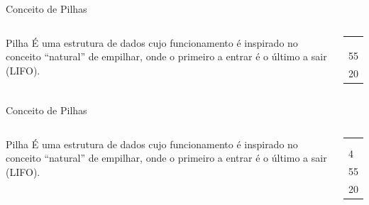 \documentclass[12pt,table,xcolor={dvipsnames}]{beamer}
\begin{document}
\begin{frame}{Conceito de Pilhas}
\begin{columns}
\begin{block}{Pilha}
É uma estrutura de dados cujo funcionamento é inspirado no conceito “natural” de empilhar, onde o primeiro a entrar é o último a sair (LIFO).
\end{block}
\begin{center}
{
\begin{tabular}{ |p{.5cm}| }
\hline
 \\ \hline
 \\ \hline
 \\ \hline
 \\ \hline
55 \\ \hline
20  \\ \hline
\end{tabular}
}
\end{center}
\end{columns}
\end{frame}

\begin{frame}{Conceito de Pilhas}
\begin{columns}
\begin{block}{Pilha}
É uma estrutura de dados cujo funcionamento é inspirado no conceito “natural” de empilhar, onde o primeiro a entrar é o último a sair (LIFO).
\end{block}
\begin{center}
{
\begin{tabular}{ |p{.5cm}| }
\hline
 \\ \hline
 \\ \hline
 \\ \hline
4 \\ \hline
55 \\ \hline
20  \\ \hline
\end{tabular}
}
\end{center}
\end{columns}
\end{frame}
\end{document}
